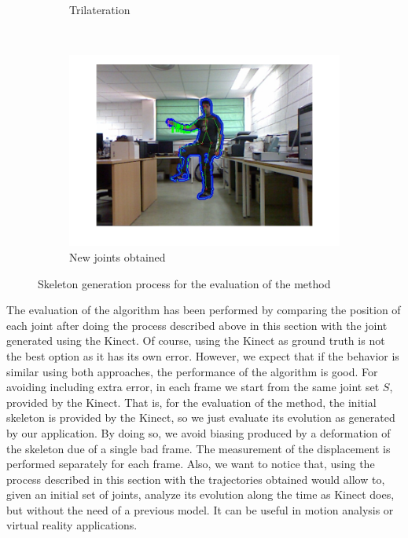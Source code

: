 \begin{figure}[t]
\begin{subfigure}[b]{0.33\textwidth}
                \caption{Trilateration}
                \label{fig:cp02_err_measure_trilateration}
        \end{subfigure}%
        ~ %
        \begin{subfigure}[b]{0.33\textwidth}
                \centering
                \includegraphics[width=\textwidth, trim=0 0 0 0,clip]{fig23.jpg}
                \caption{New joints obtained}
                \label{fig:cp02_err_measure_new_joints}
        \end{subfigure}%

        \caption{Skeleton generation process for the evaluation of the method}\label{fig:cp02_err_measure_skeleton}
\end{figure}

The evaluation of the algorithm has been performed by comparing the position of each joint after doing the process 
described above in this section with the joint generated using the Kinect. Of course, using the Kinect as ground truth 
is not the best option as it has its own error. However, we expect that if the behavior is similar using both 
approaches, the performance of the algorithm is good. For avoiding including extra error, in each frame we start from 
the same joint set $S$, provided by the Kinect. That is, for the evaluation of the method, the initial skeleton is 
provided by the Kinect, so we just evaluate its evolution as generated by our application. By doing so, we avoid biasing 
produced by a deformation of the skeleton due of a single bad frame. The measurement of the displacement is performed 
separately for each frame.
Also, we want to notice that, using the process described in this section with the trajectories obtained would allow to, 
given an initial set of joints, analyze its evolution along the time as Kinect does, but without the need of a previous 
model. It can be useful in motion analysis or virtual reality applications.


